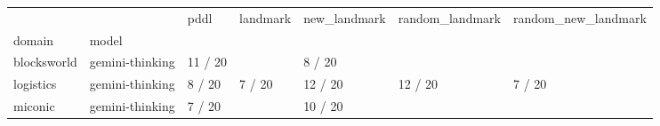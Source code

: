\begin{tabular}{lllllll}
\toprule
 &  & pddl & landmark & new\_landmark & random\_landmark & random\_new\_landmark \\
domain & model &  &  &  &  &  \\
\midrule
blocksworld & gemini-thinking & 11 / 20 &  & 8 / 20 &  &  \\
\cline{1-7}
logistics & gemini-thinking & 8 / 20 & 7 / 20 & 12 / 20 & 12 / 20 & 7 / 20 \\
\cline{1-7}
miconic & gemini-thinking & 7 / 20 &  & 10 / 20 &  &  \\
\cline{1-7}
\end{tabular}